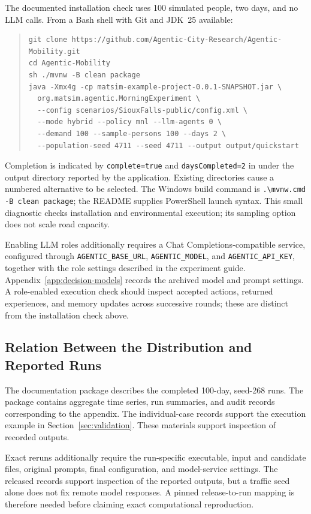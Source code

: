 The documented installation check uses 100 simulated people, two days, and no LLM calls. From a Bash shell with Git and JDK~25 available:
\begin{quote}\footnotesize
\begin{verbatim}
git clone https://github.com/Agentic-City-Research/Agentic-Mobility.git
cd Agentic-Mobility
sh ./mvnw -B clean package
java -Xmx4g -cp matsim-example-project-0.0.1-SNAPSHOT.jar \
  org.matsim.agentic.MorningExperiment \
  --config scenarios/SiouxFalls-public/config.xml \
  --mode hybrid --policy mnl --llm-agents 0 \
  --demand 100 --sample-persons 100 --days 2 \
  --population-seed 4711 --seed 4711 --output output/quickstart
\end{verbatim}
\end{quote}
Completion is indicated by \texttt{complete=true} and \texttt{daysCompleted=2} in  under the output directory reported by the application. Existing directories cause a numbered alternative to be selected. The Windows build command is \verb|.\mvnw.cmd -B clean package|; the README supplies PowerShell launch syntax. This small diagnostic checks installation and environmental execution; its sampling option does not scale road capacity.

Enabling LLM roles additionally requires a Chat Completions-compatible service, configured through \texttt{AGENTIC\_BASE\_URL}, \texttt{AGENTIC\_MODEL}, and \texttt{AGENTIC\_API\_KEY}, together with the role settings described in the experiment guide. Appendix~\ref{app:decision-models} records the archived model and prompt settings. A role-enabled execution check should inspect accepted actions, returned experiences, and memory updates across successive rounds; these are distinct from the installation check above.

\subsection{Relation Between the Distribution and Reported Runs}

The documentation package describes the completed 100-day, seed-268 runs. The package contains aggregate time series, run summaries,
and audit records corresponding to the appendix. The individual-case records support the execution example in Section~\ref{sec:validation}. These materials support inspection of recorded outputs.

Exact reruns additionally require the run-specific executable, input and candidate files, original prompts, final configuration, and model-service settings. 
The released records support inspection of the reported
outputs, but a traffic seed alone does not fix remote model responses. A pinned release-to-run mapping is therefore needed before claiming exact computational reproduction.